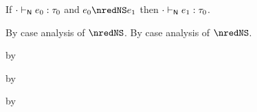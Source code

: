 \begin{lemma}\label{H-S-rr-preservation}
  If\/ ${\cdot} \vdash_{\mathsf{N}} e_0 : \tau_0$
  and\/ $\sexpr_0 \nredNS \sexpr_1$
  then\/ ${\cdot} \vdash_{\mathsf{N}} e_1 : \tau_0$.
\end{lemma}{
  \newcommand{\shortpf}{By case analysis of $\nredNS$.}
\begin{lamportproof*}
  \shortpf
\mainproof
  \shortpf

    \begin{pfproof}
      \qedstep
        \begin{pfproof}
          by 
        \end{pfproof}
    \end{pfproof}

    \begin{pfproof}
      \qedstep
        \begin{pfproof}
          by 
        \end{pfproof}
    \end{pfproof}

    \begin{pfproof}
      \qedstep
        \begin{pfproof}
          by 
        \end{pfproof}
    \end{pfproof}


\end{lamportproof*}}
